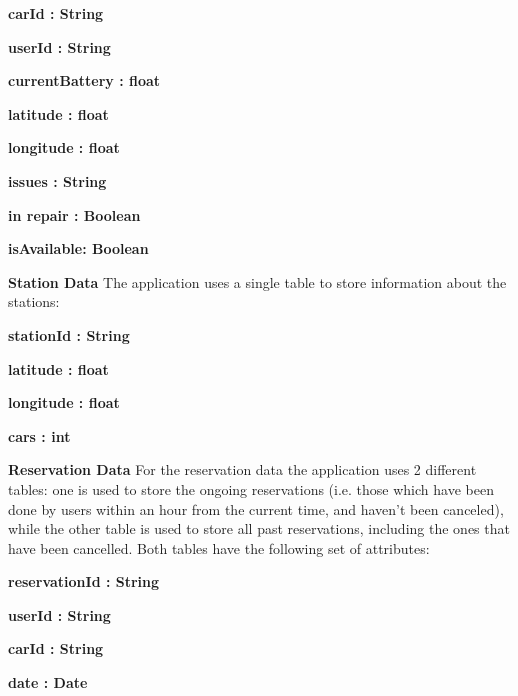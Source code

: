 \documentclass{article}
\begin{document}
\begin{flushleft}
\vspace{0.5cm}


\begin{description}
\item\textbf{carId : String} 
\item \textbf{userId : String}     
\item \textbf{currentBattery : float} 
\item \textbf{latitude : float } 
\item \textbf{longitude : float} 
\item \textbf{issues : String} 
\item \textbf{in repair : Boolean}
\item \textbf{isAvailable: Boolean}

\end{description}
\vspace{0.5cm}








\textbf{Station Data} \break
The application uses a single table to store information about the stations: 
\vspace{0.5cm}


\begin{description}
\item \textbf{stationId : String} 
\item \textbf{ latitude : float}     
\item \textbf{ longitude : float} 
\item \textbf{ cars : int } 


\end{description}







\textbf{Reservation Data} \break
For the reservation data the application uses 2 different tables: one is used to store the ongoing reservations (i.e. those which have been done by users within an hour from the current time, and haven't been canceled), while the other table is used to store all past reservations, including the ones that have been cancelled. Both tables have the following set of attributes:\\
\begin{description}
\item \textbf{reservationId : String} 
\item \textbf{userId : String}     
\item \textbf{carId : String} 
\item \textbf{date : Date } 


\end{description}
\end{flushleft}
\end{document}
